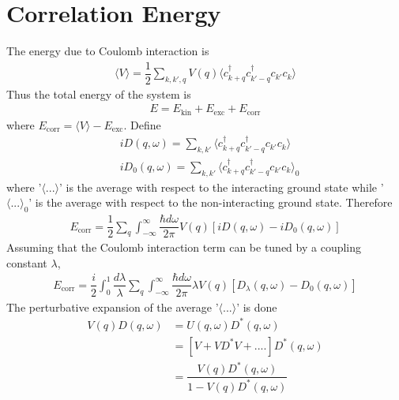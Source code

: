 \documentclass[aps,prb,onecolumn,notitlepage,showpacs,floatfix,superscriptaddress]{revtex4-1}
\begin{document}
\section{Correlation Energy}

The energy due to Coulomb interaction is
\begin{equation}
\begin{split}
\langle V \rangle= \dfrac{1}{2} \sum_{k,k',q} V(q) \langle c_{k+q}^\dagger c_{k'-q}^\dagger c_{k'} c_{k} \rangle
\end{split}
\end{equation}
 Thus the total energy of the system is
 \begin{equation}
\begin{split}
E=E_{\mathrm{kin}}+E_{\mathrm{exc}}+E_{\mathrm{corr}}
\end{split}
\end{equation}
where $E_{\mathrm{corr}}=\langle V \rangle-E_{\mathrm{exc}}$.
%
Define
\begin{equation}
\begin{split}
&i D(q,\omega)= \sum_{k,k'} \langle c_{k+q}^\dagger c_{k'-q}^\dagger c_{k'} c_{k} \rangle \\
&i D_{0}(q,\omega)= \sum_{k,k'} \langle c_{k+q}^\dagger c_{k'-q}^\dagger c_{k'} c_{k} \rangle_{0}
\end{split}
\end{equation}
where '$\langle ... \rangle$' is the average with respect to the interacting ground state while '$\langle ... \rangle_{0}$' is the average with respect to the non-interacting ground state. Therefore
\begin{equation}
\begin{split}
E_{\mathrm{corr}}=\dfrac{1}{2} \sum_{q} \int_{-\infty}^{\infty} \dfrac{\hbar d\omega}{2\pi} V(q) \left[ i D(q,\omega)- i D_{0}(q,\omega) \right]
\end{split}
\end{equation}
Assuming that the Coulomb interaction term can be tuned by a coupling constant $\lambda$,
\begin{equation}
\begin{split}
E_{\mathrm{corr}}=\dfrac{i}{2}\int_0^1\dfrac{d\lambda}{\lambda} \sum_{q} \int_{-\infty}^{\infty} \dfrac{\hbar d\omega}{2\pi} \lambda V(q) \left[ D_{\lambda}(q,\omega)- D_{0}(q,\omega) \right]
\end{split}
\end{equation}
The perturbative expansion of the average '$\langle ... \rangle$' is done 
\begin{equation}
\begin{split}
V(q)D(q,\omega)&=U(q,\omega) D^*(q,\omega) \\
&=\left[ V+VD^* V + ....\right] D^*(q,\omega) \\
&=\dfrac{V(q)D^*(q,\omega)}{1-V(q)D^*(q,\omega)}
\end{split}
\end{equation}
\end{document}
